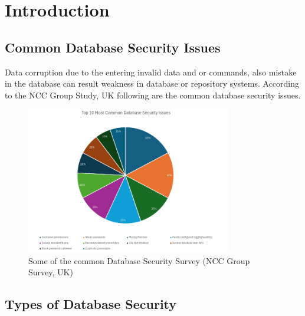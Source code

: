 \documentclass[12pt]{book} %
\begin{document}
\section*{Introduction}


\subsection*{Common Database Security Issues}


Data corruption due to the entering invalid data and or commands, also mistake in the database can result weakness in database or repository systems. According to the NCC Group Study, UK following are the common
database security issues.\cite{a_comprve_rev_of_sec_measr_in_db_sys_assess_auth_accss_ctrl_bynd} \label{sec:a_comprve_rev_of_sec_measr_in_db_sys_assess_auth_accss_ctrl_bynd_1}\\

\begin{figure}[h]
	\begin{center}
	\includegraphics[width=0.8\textwidth]{assets/top_10_most_common_db_security_issues.png}
	\end{center}
	\caption[]{Some of the common Database Security
    Survey (NCC Group Survey, UK)}
	\label{fig:top_10_most_common_db_security_issues}
\end{figure}


\subsection*{Types of Database Security}
\end{document}
